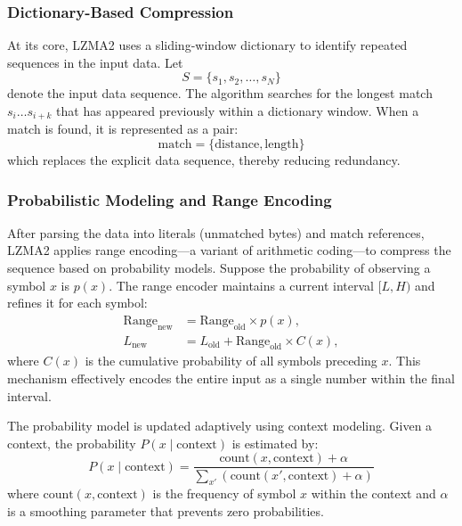 \subsubsection{Dictionary-Based Compression}
At its core, LZMA2 uses a sliding-window dictionary to identify repeated sequences in the input data. Let 
\[
S = \{s_1, s_2, \dots, s_N\}
\]
denote the input data sequence. The algorithm searches for the longest match \( s_i \dots s_{i+k} \) that has appeared previously within a dictionary window. When a match is found, it is represented as a pair:
\begin{equation}
    \text{match} = \{ \text{distance}, \text{length} \}
\end{equation}
which replaces the explicit data sequence, thereby reducing redundancy.

\subsubsection{Probabilistic Modeling and Range Encoding}
After parsing the data into literals (unmatched bytes) and match references, LZMA2 applies range encoding—a variant of arithmetic coding—to compress the sequence based on probability models. Suppose the probability of observing a symbol \( x \) is \( p(x) \). The range encoder maintains a current interval \([L, H)\) and refines it for each symbol:
\begin{equation}
    \begin{aligned}
        \text{Range}_{\text{new}} &= \text{Range}_{\text{old}} \times p(x), \\
        L_{\text{new}} &= L_{\text{old}} + \text{Range}_{\text{old}} \times C(x),
    \end{aligned}
\end{equation}
where \( C(x) \) is the cumulative probability of all symbols preceding \( x \). This mechanism effectively encodes the entire input as a single number within the final interval.

The probability model is updated adaptively using context modeling. Given a context, the probability \( P(x \mid \text{context}) \) is estimated by:
\begin{equation}
    P(x \mid \text{context}) = \frac{\text{count}(x, \text{context}) + \alpha}{\sum_{x'} \left(\text{count}(x', \text{context}) + \alpha\right)}
\end{equation}
where \(\text{count}(x, \text{context})\) is the frequency of symbol \(x\) within the context and \(\alpha\) is a smoothing parameter that prevents zero probabilities.

